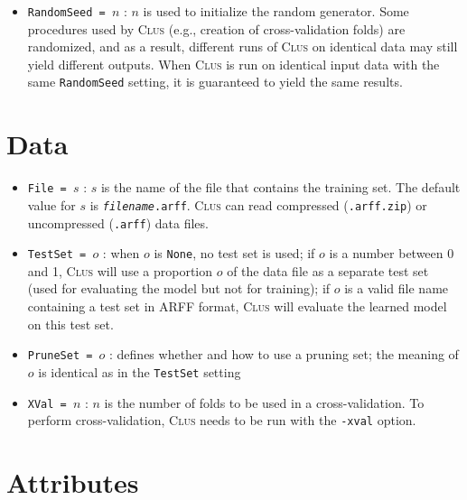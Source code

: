 \documentclass[a4paper]{report}
\newcommand{\clus}{\textsc{Clus}}
\begin{document}
\begin{itemize}
\item {\tt RandomSeed = $n$}\label{sett:seed} : $n$ is used to initialize the random generator.
Some procedures used by \clus{} (e.g., creation of cross-validation folds) are randomized, and as a result, different runs of \clus{} on identical data may still yield different outputs.  When \clus{} is run on identical input data with the same {\tt RandomSeed} setting, it is guaranteed to yield the same results.
\end{itemize}

\section{Data}

\begin{itemize}
\item {\tt File = $s$} : $s$ is the name of the file that contains the training set.  The default value for $s$ is {\tt {\em filename}.arff}.  \clus{} can read compressed ({\tt .arff.zip}) or uncompressed ({\tt .arff}) data files.
\item {\tt TestSet = $o$} : when $o$ is {\tt None}, no test set is used; if $o$ is a number between 0 and 1, \clus{} will use a proportion $o$ of the data file as a separate test set (used for evaluating the model but not for training); if $o$ is a valid file name containing a test set in ARFF format, \clus{} will evaluate the learned model on this test set.
\item {\tt PruneSet = $o$} : defines whether and how to use a pruning set; the meaning of $o$ is identical as in the {\tt TestSet} setting
\item {\tt XVal = $n$}\label{sett:xval} : $n$ is the number of folds to be used in a cross-validation.  To perform cross-validation, \clus{} needs to be run with the {\tt -xval} option.
\end{itemize}

\section{Attributes}
\end{document}
